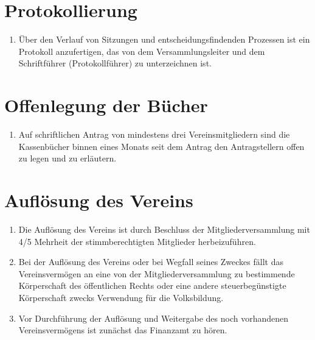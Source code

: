 \documentclass[ngerman]{scrartcl}
\begin{document}
\section{Protokollierung} \label{sec:protokollierung}
\begin{enumerate}
 \item Über den Verlauf von Sitzungen und entscheidungsfindenden
 Prozessen ist ein Protokoll anzufertigen, das von dem
 Versammlungsleiter und dem Schriftführer (Protokollführer) zu
 unterzeichnen ist.
\end{enumerate}
\section{Offenlegung der Bücher} \label{sec:offenlegung_der_buecher}
\begin{enumerate}
 \item Auf schriftlichen Antrag von mindestens drei
 Vereinsmitgliedern sind die Kassenbücher binnen eines Monats
 seit dem Antrag den Antragstellern offen zu legen und zu
 erläutern.
\end{enumerate}
\section{Auflösung des Vereins} \label{sec:aufloesung_des_vereins}
\begin{enumerate}
 \item Die Auflösung des Vereins ist durch Beschluss der
 Mitgliederversammlung mit 4/5 Mehrheit der stimmberechtigten
 Mitglieder herbeizuführen.

 \item Bei der Auflösung des Vereins oder bei Wegfall seines Zweckes fällt das Vereinsvermögen
 an eine von der Mitgliederversammlung zu bestimmende Körperschaft des öffentlichen
 Rechts oder eine andere steuerbegünstigte Körperschaft zwecks Verwendung für die Volksbildung.

 \item Vor Durchführung der Auflösung und Weitergabe des noch
 vorhandenen Vereinsvermögens ist zunächst das Finanzamt zu
 hören.
\end{enumerate}
\end{document}
